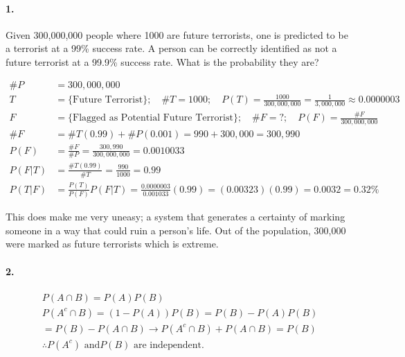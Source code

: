     \paragraph*{1.}
    \begin{mdframed}
        Given 300,000,000 people where 1000 are future terrorists, one is predicted to be a terrorist at a 99\% success rate. A person can be correctly identified as not a future terrorist at a 99.9\% success rate. What is the probability they are?

        \begin{align*}
            \#P & = 300,000,000  \\
            T & = \{\text{Future Terrorist}\}; \quad \#T = 1000; \quad P(T) = \frac{1000}{300,000,000} = \frac{1}{3,000,000} \approx 0.0000003 \\
            F & = \{\text{Flagged as Potential Future Terrorist}\}; \quad \#F = ?; \quad P(F) = \frac{\#F}{300,000,000}  \\
            \#F & = \#T(0.99) + \#P(0.001) = 990 + 300,000 = 300,990 \\
            P(F) & = \frac{\#F}{\#P} = \frac{300,990}{300,000,000} = 0.0010033  \\
            P(F|T) & = \frac{\#T(0.99)}{\#T} = \frac{990}{1000} = 0.99 \\
            P(T|F) & = \frac{P(T)}{P(F)}P(F|T) = \frac{0.0000003}{0.001033}(0.99) = (0.00323)(0.99) = 0.0032 = 0.32\%
        \end{align*}


        This does make me very uneasy; a system that generates a certainty of marking someone in a way that could ruin a person's life. Out of the population, 300,000 were marked as future terrorists which is extreme.
    \end{mdframed}

    \paragraph*{2.}
    \begin{mdframed}
        \begin{equation*}
            \begin{gathered}
                P(A \cap B) = P(A)P(B)    \\
                P(A^c \cap B) = (1-P(A))P(B) = P(B) - P(A)P(B)  \\
                = P(B) - P(A \cap B) \rightarrow P(A^c \cap B) + P(A \cap B) = P(B)\\
                \therefore P(A^c) \text{ and} P(B) \text{ are independent.}
            \end{gathered}
        \end{equation*}
    \end{mdframed}

